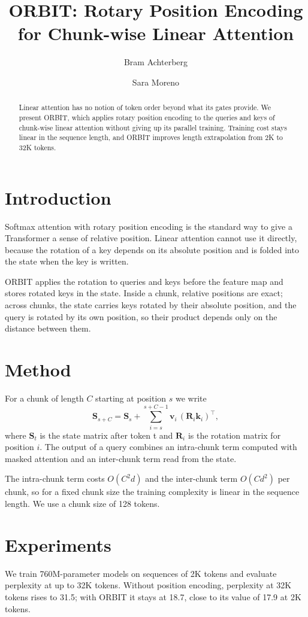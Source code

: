 \documentclass{article}
\title{ORBIT: Rotary Position Encoding for Chunk-wise Linear Attention}
\author{Bram Achterberg \and Sara Moreno}
\begin{document}
\maketitle

\begin{abstract}
Linear attention has no notion of token order beyond what its gates provide. We present ORBIT, which applies rotary position encoding to the queries and keys of chunk-wise linear attention without giving up its parallel training. Training cost stays linear in the sequence length, and ORBIT improves length extrapolation from 2K to 32K tokens.
\end{abstract}

\section{Introduction}
Softmax attention with rotary position encoding is the standard way to give a Transformer a sense of relative position. Linear attention cannot use it directly, because the rotation of a key depends on its absolute position and is folded into the state when the key is written.

ORBIT applies the rotation to queries and keys before the feature map and stores rotated keys in the state. Inside a chunk, relative positions are exact; across chunks, the state carries keys rotated by their absolute position, and the query is rotated by its own position, so their product depends only on the distance between them.

\section{Method}
For a chunk of length $C$ starting at position $s$ we write
\begin{equation}
\mathbf{S}_{s+C} = \mathbf{S}_{s} + \sum_{i=s}^{s+C-1} \mathbf{v}_i \, (\mathbf{R}_{i} \mathbf{k}_i)^\top ,
\end{equation}
where $\mathbf{S}_t$ is the state matrix after token t and $\mathbf{R}_i$ is the rotation matrix for position $i$. The output of a query combines an intra-chunk term computed with masked attention and an inter-chunk term read from the state.

The intra-chunk term costs $O(C^2 d)$ and the inter-chunk term $O(C d^2)$ per chunk, so for a fixed chunk size the training complexity is linear in the sequence length. We use a chunk size of 128 tokens.

\section{Experiments}
We train 760M-parameter models on sequences of 2K tokens and evaluate perplexity at up to 32K tokens. Without position encoding, perplexity at 32K tokens rises to 31.5; with ORBIT it stays at 18.7, close to its value of 17.9 at 2K tokens.
\end{document}
